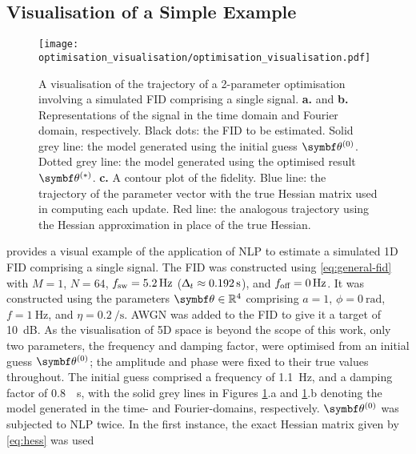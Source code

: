\subsection{Visualisation of a Simple Example}
\label{subsec:optim-vis}
\begin{figure}
    \centering
    \texttt{[image: optimisation\_visualisation/optimisation\_visualisation.pdf]}
    \caption[
        A visualisation of the trajectory of a 2-parameter optimisation
        involving a simulated \acs{FID}.
    ]
    {
        A visualisation of the trajectory of a 2-parameter optimisation
        involving a simulated \acs{FID} comprising a single signal.
        \textbf{a.} and \textbf{b.} Representations of the signal in
        the time domain and Fourier domain, respectively.
        Black dots: the \ac{FID} to be estimated.
        Solid grey line: the model generated
        using the initial guess $\bthzero$.
        Dotted grey line: the model generated using the optimised result
        $\bthstar$.
        \textbf{c.} A contour plot of the fidelity.
        Blue line: the trajectory of the parameter vector with the true
        Hessian matrix used in computing each update.
        Red line: the analogous trajectory using the Hessian approximation
        in place of the true Hessian.
    }
    \label{fig:optim-vis}
\end{figure}
 provides a visual example of the application of \ac{NLP}
to estimate a simulated \ac{1D} \ac{FID} comprising a single signal.
The FID was constructed using \cref{eq:general-fid} with $M=1$,
$N = 64$, $f_{\mathrm{sw}} = \qty{5.2}{\hertz}$ ($\Updelta_t \approx
\qty{0.192}{\second}$), and $f_{\text{off}} = \qty{0}{\hertz}$.
It was constructed using the parameters $\bth \in \mathbb{R}^4$ comprising $a=1$,
$\phi=\qty{0}{\radian}$, $f=\qty{1}{\hertz}$, and $\eta=\qty{0.2}{\per\second}$.
\ac{AWGN} was added to the \ac{FID} to give it a target  of
\qty{10}{\deci\bel}. As the visualisation of 5D space is beyond the scope of
this work, only two parameters, the frequency and damping factor, were optimised
from an initial guess $\bthzero$; the amplitude and phase were fixed to
their true values throughout. The initial guess comprised a frequency of
\qty{1.1}{\hertz}, and a damping factor of \qty{0.8}{\per\second}, with the
solid grey lines in Figures \ref{fig:optim-vis}.a and \ref{fig:optim-vis}.b
denoting the model generated in the time- and
Fourier-domains, respectively. $\bthzero$ was subjected to \ac{NLP} twice. In
the first instance, the exact Hessian matrix given by \cref{eq:hess} was used
